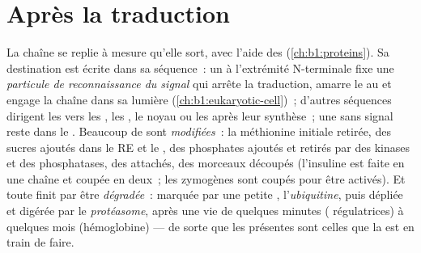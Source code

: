 \section{Après la traduction}

\begin{proposition}\label{prop:b1:gene-expression:after}
La chaîne se replie à mesure qu'elle sort, avec l'aide des 
(\cref{ch:b1:proteins}). Sa destination est écrite dans sa séquence~: un
\emph{} à l'extrémité N-terminale fixe une \emph{particule
de reconnaissance du signal} qui arrête la traduction, amarre le
 au  et engage la chaîne dans sa lumière
(\cref{ch:b1:eukaryotic-cell})~; d'autres séquences dirigent les
 vers les , les , le noyau ou les
 après leur synthèse~; une  sans signal reste dans le
. Beaucoup de  sont \emph{modifiées}~: la méthionine
initiale retirée, des sucres ajoutés dans le RE et le , des
phosphates ajoutés et retirés par des kinases et des phosphatases, des
 attachés, des morceaux découpés (l'insuline est faite en une
chaîne et coupée en deux~; les zymogènes sont coupés pour être activés).
Et toute  finit par être \emph{dégradée}~: marquée par une
petite , l'\emph{ubiquitine}, puis dépliée et digérée par le
\emph{protéasome}, après une vie de quelques minutes (
régulatrices) à quelques mois (hémoglobine) --- de sorte que les
 présentes sont celles que la  est en train de faire.
\end{proposition}

